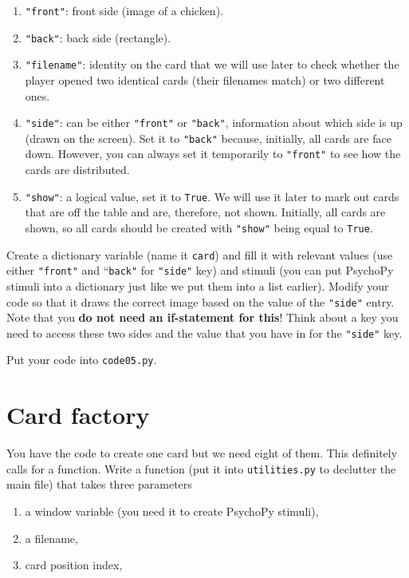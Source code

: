 \documentclass[
]{book}
\providecommand{\tightlist}{%
  \setlength{\itemsep}{0pt}\setlength{\parskip}{0pt}}
\begin{document}
\begin{enumerate}
\def\labelenumi{\arabic{enumi}.}
\tightlist
\item
  \texttt{"front"}: front side (image of a chicken).
\item
  \texttt{"back"}: back side (rectangle).
\item
  \texttt{"filename"}: identity on the card that we will use later to check whether the player opened two identical cards (their filenames match) or two different ones.
\item
  \texttt{"side"}: can be either \texttt{"front"} or \texttt{"back"}, information about which side is up (drawn on the screen). Set it to \texttt{"back"} because, initially, all cards are face down. However, you can always set it temporarily to \texttt{"front"} to see how the cards are distributed.
\item
  \texttt{"show"}: a logical value, set it to \texttt{True}. We will use it later to mark out cards that are off the table and are, therefore, not shown. Initially, all cards are shown, so all cards should be created with \texttt{"show"} being equal to \texttt{True}.
\end{enumerate}

Create a dictionary variable (name it \texttt{card}) and fill it with relevant values (use either \texttt{"front"} and ``\texttt{back"} for \texttt{"side"} key) and stimuli (you can put PsychoPy stimuli into a dictionary just like we put them into a list earlier). Modify your code so that it draws the correct image based on the value of the \texttt{"side"} entry. Note that you \textbf{do not need an if-statement for this}! Think about a key you need to access these two sides and the value that you have in for the \texttt{"side"} key.

Put your code into \texttt{code05.py}.

\hypertarget{card-factory}{%
\section{Card factory}\label{card-factory}}

You have the code to create one card but we need eight of them. This definitely calls for a function. Write a function (put it into \texttt{utilities.py} to declutter the main file) that takes three parameters

\begin{enumerate}
\def\labelenumi{\arabic{enumi}.}
\tightlist
\item
  a window variable (you need it to create PsychoPy stimuli),
\item
  a filename,
\item
  card position index,
\end{enumerate}
\end{document}
